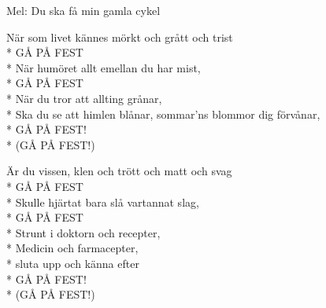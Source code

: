 \begin{SongText}[Gå på fest]
    \begin{SongInfo}
        Mel: Du ska få min gamla cykel
    \end{SongInfo}
    \begin{SongVerse}
        När som livet kännes mörkt och grått och trist\\*%
        GÅ PÅ FEST\\*%
        När humöret allt emellan du har mist,\\*%
        GÅ PÅ FEST\\*%
        När du tror att allting grånar,\\*%
        Ska du se att himlen blånar, sommar'ns blommor dig
        förvånar,\\*%
        GÅ PÅ FEST!\\*%
        (GÅ PÅ FEST!)
    \end{SongVerse}
    \begin{SongVerse}
        Är du vissen, klen och trött och matt och svag\\*%
        GÅ PÅ FEST\\*%
        Skulle hjärtat bara slå vartannat slag,\\*%
        GÅ PÅ FEST\\*%
        Strunt i doktorn och recepter,\\*%
        Medicin och farmacepter,\\*%
        sluta upp och känna efter\\*%
        GÅ PÅ FEST!\\*%
        (GÅ PÅ FEST!)
    \end{SongVerse}
\end{SongText}
